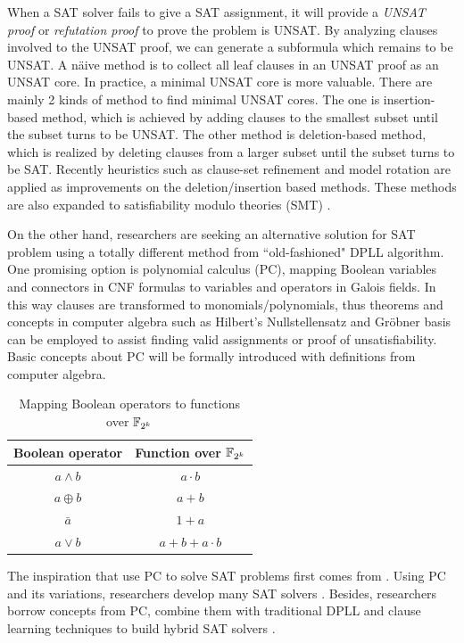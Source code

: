 When a SAT solver fails to give a SAT assignment, it will provide a {\it UNSAT proof} or {\it refutation proof}
to prove the problem is UNSAT. By analyzing clauses involved to the UNSAT proof, we can 
generate a subformula which remains to be UNSAT. A n\"aive method is to collect all leaf 
clauses in an UNSAT proof as an UNSAT core. In practice, a minimal UNSAT core is more valuable.
There are mainly 2 kinds of method to find minimal UNSAT cores.
The one is insertion-based method, which is achieved by adding clauses to the smallest subset 
until the subset turns to be UNSAT. The other method is deletion-based method,
which is realized by deleting clauses from a larger subset until the subset turns to be SAT.
Recently heuristics such as clause-set refinement \cite{modelrotation} and model rotation \cite{belov2011accelerating}
are applied as improvements on the deletion/insertion based methods.
These methods are also expanded to satisfiability modulo theories (SMT) \cite{cimatti2007simple}.

On the other hand, researchers are seeking an alternative solution for SAT problem using a totally
different method from ``old-fashioned" DPLL algorithm. One promising option is polynomial calculus (PC),
mapping Boolean variables and connectors in CNF formulas to variables and operators in 
Galois fields. In this way clauses are transformed to monomials/polynomials, thus theorems and concepts in computer
algebra such as Hilbert's Nullstellensatz and Gr\"obner basis can be employed to assist finding
valid assignments or proof of unsatisfiability. Basic concepts about PC will be formally introduced with definitions
from computer algebra.

\begin{table}[htb]
\centering
\begin{tabular}{|c|c|} 
\hline
 Boolean operator & Function over ${\mathbb{F}}_{2^k}$ \\
\hline
\hline
 $a\land b$ & $a\cdot b$ \\
\hline
 $a\oplus b$ & $a+b$ \\
\hline
 $\bar{a}$ & $1+a$ \\
\hline
 $a\lor b$ & $a+b+a\cdot b$\\
\hline
\end{tabular}
\caption{Mapping Boolean operators to functions over ${\mathbb{F}}_{2^k}$}
\label{tab:booltof4}  
\end{table}

The inspiration that use PC to solve SAT problems first comes from \cite{ceiSTOC96}.
Using PC and its variations, researchers develop many SAT solvers \cite{STABLE,BLUEVERI,PolyBoRi}. 
Besides, researchers borrow concepts from PC, combine them with traditional DPLL and clause learning techniques
to build hybrid SAT solvers \cite{condratTACAS07,Zengler2010}.

